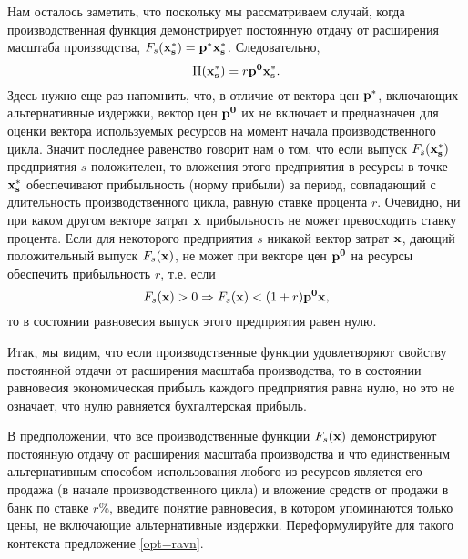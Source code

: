     Нам осталось заметить, что поскольку мы рассматриваем случай,
    когда производственная функция демонстрирует постоянную отдачу
    от расширения масштаба производства,
    $F_{s}(\mathbf{x_{s}^{*}})=\mathbf{p^{*}}\mathbf{x_{s}^{*}}$.
    Следовательно,
\[
    \Pi(\mathbf{x_{s}^{*}})=r\mathbf{p^{0}}\mathbf{x_{s}^{*}}.
\]
    Здесь нужно еще раз напомнить, что, в отличие от вектора цен
    $\mathbf{p^{*}}$, включающих альтернативные издержки, вектор цен
    $\mathbf{p^{0}}$ их не включает и предназначен для оценки вектора
    используемых ресурсов на момент начала производственного цикла.
    Значит последнее равенство говорит нам о том, что если выпуск
    $F_{s}(\mathbf{x_{s}^{*}})$ предприятия $s$ положителен, то вложения
    этого предприятия в ресурсы в точке $\mathbf{x_{s}^{*}}$ обеспечивают
    прибыльность (норму прибыли) за период, совпадающий
    с длительность производственного цикла,
    равную ставке процента $r$. Очевидно, ни
    при каком другом векторе затрат $\mathbf{x}$ прибыльность не может
    превосходить ставку процента. Если для
    некоторого предприятия $s$ никакой вектор затрат $\mathbf{x}$, дающий
    положительный выпуск $F_{s}(\mathbf{x})$, не может при векторе цен $\mathbf{p^{0}}$
    на ресурсы обеспечить прибыльность $r$, т.е. если
\[
    F_{s}(\mathbf{x})>0 \Rightarrow
    F_{s}(\mathbf{x})<(1+r)\mathbf{p^{0}}\mathbf{x},
\]
    то в состоянии равновесия выпуск этого предприятия равен нулю.

    Итак, мы видим, что если производственные функции удовлетворяют
    свойству постоянной отдачи от расширения масштаба производства,
    то в состоянии равновесия экономическая прибыль каждого
    предприятия равна нулю, но это не означает, что нулю равняется
    бухгалтерская прибыль.

\begin{exer}
    В предположении, что все производственные функции
    $F_{s}(\mathbf{x})$ демонстрируют постоянную отдачу от расширения
    масштаба производства и что единственным альтернативным способом
    использования любого из ресурсов является его продажа (в начале производственного
    цикла) и вложение средств от продажи в банк по ставке $r\%$,
    введите понятие равновесия, в котором упоминаются только цены, не включающие
    альтернативные издержки.
    Переформулируйте для такого контекста предложение
    \ref{opt=ravn}.
\end{exer}





